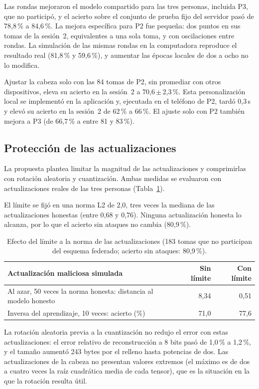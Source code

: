 Las rondas mejoraron el modelo compartido para las tres personas, incluida P3, que no participó, y el acierto sobre el conjunto de prueba fijo del servidor pasó de 78,8\,\% a 84,6\,\%. La mejora específica para P2 fue pequeña: dos puntos en sus tomas de la sesión~2, equivalentes a una sola toma, y con oscilaciones entre rondas. La simulación de las mismas rondas en la computadora reproduce el resultado real (81,8\,\% y 59,6\,\%), y aumentar las épocas locales de dos a ocho no lo modifica.

Ajustar la cabeza solo con las 84 tomas de P2, sin promediar con otros dispositivos, eleva su acierto en la sesión~2 a 70,6\,$\pm$\,2,3\,\%. Esta personalización local se implementó en la aplicación y, ejecutada en el teléfono de P2, tardó 0,3\,s y elevó su acierto en la sesión~2 de 62\,\% a 66\,\%. El ajuste solo con P2 también mejora a P3 (de 66,7\,\% a entre 81 y 83\,\%).

\subsection{Protección de las actualizaciones}

La propuesta plantea limitar la magnitud de las actualizaciones y comprimirlas con rotación aleatoria y cuantización. Ambas medidas se evaluaron con actualizaciones reales de las tres personas (Tabla~\ref{tab:limite}).

El límite se fijó en una norma L2 de 2,0, tres veces la mediana de las actualizaciones honestas (entre 0,68 y 0,76). Ninguna actualización honesta lo alcanza, por lo que el acierto sin ataques no cambia (80,9\,\%).

\begin{table}[h]
    \centering
    \begin{tabular}{p{8.5cm}rr}
        \toprule
        Actualización maliciosa simulada & Sin límite & Con límite \\
        \midrule
        Al azar, 50 veces la norma honesta: distancia al modelo honesto & 8,34 & 0,51 \\
        Inversa del aprendizaje, 10 veces: acierto (\%) & 71,0 & 77,6 \\
        \bottomrule
    \end{tabular}
    \caption{Efecto del límite a la norma de las actualizaciones (183 tomas que no participan del esquema federado; acierto sin ataques: 80,9\,\%).}
    \label{tab:limite}
\end{table}

La rotación aleatoria previa a la cuantización no redujo el error con estas actualizaciones: el error relativo de reconstrucción a 8 bits pasó de 1,0\,\% a 1,2\,\%, y el tamaño aumentó 243 bytes por el relleno hasta potencias de dos. Las actualizaciones de la cabeza no presentan valores extremos (el máximo es de dos a cuatro veces la raíz cuadrática media de cada tensor), que es la situación en la que la rotación resulta útil.


